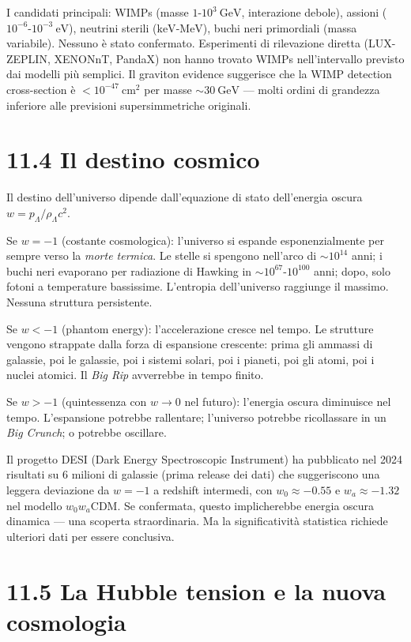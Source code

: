 \documentclass[11.5pt,a4paper,openany]{book}
\theoremstyle{remark}
\begin{document}
I candidati principali: WIMPs (masse $1$-$10^3\ \text{GeV}$, interazione debole), assioni ($10^{-6}$-$10^{-3}\ \text{eV}$), neutrini sterili ($\text{keV}$-$\text{MeV}$), buchi neri primordiali (massa variabile). Nessuno è stato confermato. Esperimenti di rilevazione diretta (LUX-ZEPLIN, XENONnT, PandaX) non hanno trovato WIMPs nell'intervallo previsto dai modelli più semplici. Il graviton evidence suggerisce che la WIMP detection cross-section è $< 10^{-47}\ \text{cm}^2$ per masse $\sim 30\ \text{GeV}$ --- molti ordini di grandezza inferiore alle previsioni supersimmetriche originali.

\section{11.4 Il destino cosmico}

Il destino dell'universo dipende dall'equazione di stato dell'energia oscura $w = p_\Lambda/\rho_\Lambda c^2$.

Se $w = -1$ (costante cosmologica): l'universo si espande esponenzialmente per sempre verso la \textit{morte termica}. Le stelle si spengono nell'arco di $\sim 10^{14}$ anni; i buchi neri evaporano per radiazione di Hawking in $\sim 10^{67}$-$10^{100}$ anni; dopo, solo fotoni a temperature bassissime. L'entropia dell'universo raggiunge il massimo. Nessuna struttura persistente.

Se $w < -1$ (phantom energy): l'accelerazione cresce nel tempo. Le strutture vengono strappate dalla forza di espansione crescente: prima gli ammassi di galassie, poi le galassie, poi i sistemi solari, poi i pianeti, poi gli atomi, poi i nuclei atomici. Il \textit{Big Rip} avverrebbe in tempo finito.

Se $w > -1$ (quintessenza con $w \to 0$ nel futuro): l'energia oscura diminuisce nel tempo. L'espansione potrebbe rallentare; l'universo potrebbe ricollassare in un \textit{Big Crunch}; o potrebbe oscillare.

Il progetto DESI (Dark Energy Spectroscopic Instrument) ha pubblicato nel 2024 risultati su 6 milioni di galassie (prima release dei dati) che suggeriscono una leggera deviazione da $w = -1$ a redshift intermedi, con $w_0 \approx -0.55$ e $w_a \approx -1.32$ nel modello $w_0 w_a$CDM. Se confermata, questo implicherebbe energia oscura dinamica --- una scoperta straordinaria. Ma la significatività statistica richiede ulteriori dati per essere conclusiva.

\section{11.5 La Hubble tension e la nuova cosmologia}
\end{document}
